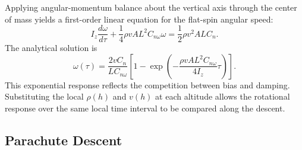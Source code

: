 \documentclass[12pt,a4paper]{article}
\numberwithin{equation}{section}
\begin{document}
Applying angular-momentum balance about the vertical axis through the center of mass yields a first-order linear equation for the flat-spin angular speed:
\begin{equation*}
 I_z\frac{d\omega}{d\tau}+\frac14\rho vAL^2C_{n\omega}\omega
 =\frac12\rho v^2ALC_n.
\end{equation*}
The analytical solution is
\begin{equation}
 \omega(\tau)=\frac{2vC_n}{LC_{n\omega}}
 \left[1-\exp\left(-\frac{\rho vAL^2C_{n\omega}}{4I_z}\tau\right)\right].
 \label{eq:spinresponse}
\end{equation}
This exponential response reflects the competition between bias and damping. Substituting the local $\rho(h)$ and $v(h)$ at each altitude allows the rotational response over the same local time interval to be compared along the descent.

\subsection{Parachute Descent}
\end{document}

